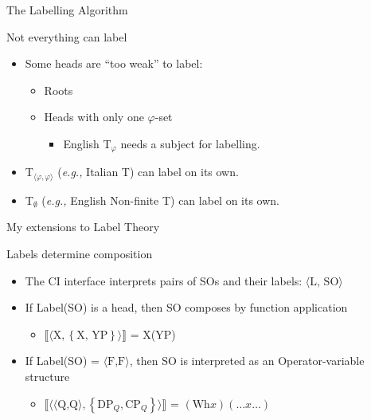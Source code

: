 \documentclass[Proposal]{subfiles}
\begin{document}
\begin{frame}
  {The Labelling Algorithm}

  \begin{block}
    {Not everything can label}
    \begin{itemize}[<+->]
      \item Some heads are ``too weak'' to label:
	\begin{itemize}
	  \item Roots
	  \item Heads with only one $\varphi$-set
	    \begin{itemize}
	      \item English T$_\varphi$ needs a subject for labelling.
	    \end{itemize}
	\end{itemize}
    \end{itemize}
  \end{block}
  \begin{itemize}[<+->]
    \item T$_{\langle \varphi,\varphi\rangle}$ (\textit{e.g.,} Italian T) can label on its own.
    \item T$_\emptyset$ (\textit{e.g.,} English Non-finite T) can label on its own.
  \end{itemize}
\end{frame}
\begin{frame}
  {My extensions to Label Theory}
  \begin{block}
    {Labels determine composition}
    \begin{itemize}
      \item The CI interface interprets pairs of SOs and their labels: $\langle \text{L, SO} \rangle$
      \item<2-> If Label(SO) is a head, then SO composes by function application
	\begin{itemize}
	  \item<3-> $\llbracket\langle \text{X}, \left\{ \text{X, YP} \right\}\rangle\rrbracket$ = X(YP)
	\end{itemize}
      \item<4-> If Label(SO) = $\langle\text{F,F}\rangle$, then SO is interpreted as an Operator-variable structure
	\begin{itemize}
	  \item<5-> $\llbracket\langle \langle\text{Q,Q} \rangle, \left\{ \text{DP}_Q, \text{CP}_Q \right\}\rangle\rrbracket$ = $(\text{Wh}x)(\dots x \dots)$
	\end{itemize}
    \end{itemize}
  \end{block}
\end{frame}
\end{document}
